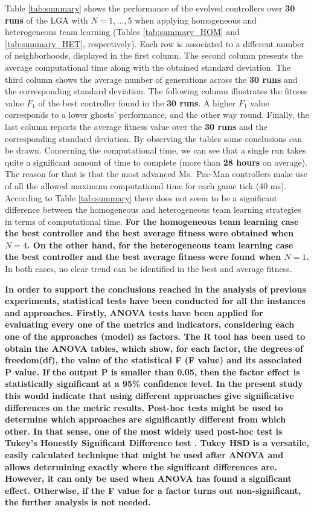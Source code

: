 \documentclass[journal]{IEEEtran}
\begin{document}
Table \ref{tab:summary} shows the performance of the evolved controllers over \textbf{30 runs }of the LGA with $N=1,\ldots,5$ when applying homogeneous and heterogeneous team learning (Tables \ref{tab:summary_HOM} and \ref{tab:summary_HET}, respectively). Each row is associated to a different number of neighborhoods, displayed in the first column. The second column presents the average computational time along with the obtained standard deviation. The third column shows the average number of generations across the \textbf{30 runs }and the corresponding standard deviation. The following column illustrates the fitness value $F_1$ of the best controller found in the \textbf{30 runs}. A higher $F_1$ value corresponds to a lower ghosts' performance, and the other way round. Finally, the last column reports the average fitness value over the \textbf{30 runs }and the corresponding standard deviation. By observing the tables some conclusions can be drawn.
Concerning the computational time, we can see that a single run takes
quite a significant amount of time to complete (more than \textbf{28 hours}
on average). The reason for that is that the most advanced
Ms.\  Pac-Man controllers make use of all the allowed maximum
computational time for each game tick (40 ms). According to Table \ref{tab:summary} there does not seem to be a significant difference between the homogeneous and heterogeneous team learning strategies in terms of computational time.
\textbf{For the homogeneous team learning case the best controller and the best average fitness were obtained when $N=4$. On the other hand, for the heterogeneous team learning case the best controller and the best average fitness were found when $N=1$. }In both cases, no clear trend can be identified in the best and average fitness. 

\textbf{In order to support the conclusions reached in the analysis of previous experiments, statistical tests have been conducted for all the instances and approaches.  Firstly, ANOVA tests \cite{Fisher25,Fisher36} have been applied for evaluating every one of the metrics and indicators, considering each one of the approaches (model) as factors. The R tool has been used to obtain the ANOVA tables, which show, for each factor, the degrees of freedom(df), the value of the statistical F (F value) and its associated P value. If the output P is smaller than 0.05, then the factor effect is statistically significant at a 95\% confidence level. In the present study this would indicate that using different approaches give significative differences on the metric results. Post-hoc tests might be used to determine which approaches are significantly different from which other.  In that sense, one of the most widely used post-hoc test is Tukey’s Honestly Significant Difference test \cite{Dickinson1971}. Tukey HSD is a versatile, easily calculated technique that might be used after ANOVA and allows determining exactly where the significant differences are. However, it can only be used when ANOVA has found a significant effect. Otherwise, if the F value for a factor turns out non-significant, the further analysis is not needed.}
\end{document}
